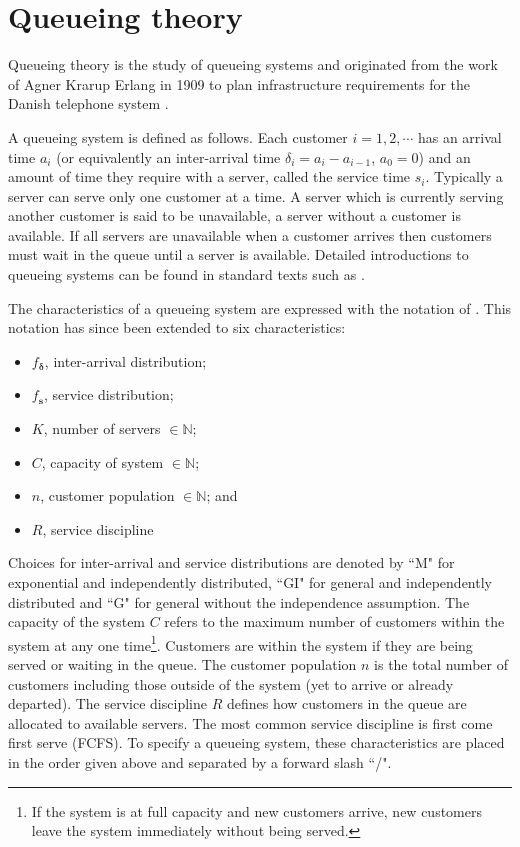 \documentclass[article]{jss}
\begin{document}
\section{Queueing theory} \label{sec:queueing}

Queueing theory is the study of queueing systems and originated from the work of Agner Krarup Erlang in 1909 to plan infrastructure requirements for the Danish telephone system \citep[pg 2]{thomopoulos2012fundamentals}. 

A queueing system is defined as follows. Each customer $i = 1,2,\cdots$ has an arrival time $a_i$ (or equivalently an inter-arrival time $\delta_i = a_i - a_{i-1}$, $a_0 = 0$) and an amount of time they require with a server, called the service time $s_i$. Typically a server can serve only one customer at a time. A server which is currently serving another customer is said to be unavailable, a server without a customer is available. If all servers are unavailable when a customer arrives then customers must wait in the queue until a server is available. Detailed introductions to queueing systems can be found in standard texts such as \citet{bhat2015introduction}. 

The characteristics of a queueing system are expressed with the notation of \citet{kendall1953stochastic}. This notation has since been extended to six characteristics:
\begin{itemize}
\item $f_{\mathbf{\delta}}$, inter-arrival distribution;
\item $f_{\mathbf{s}}$, service distribution; 
\item $K$, number of servers $\in \mathbb{N}$;
\item $C$, capacity of system $\in \mathbb{N}$; 
\item $n$, customer population $\in \mathbb{N}$; and
\item $R$, service discipline
\end{itemize}

Choices for inter-arrival and service distributions are denoted by ``M" for exponential and independently distributed, ``GI" for general and independently distributed and ``G" for general without the independence assumption. The capacity of the system $C$ refers to the maximum number of customers within the system at any one time\footnote{If the system is at full capacity and new customers arrive, new customers leave the system immediately without being served.}. Customers are within the system if they are being served or waiting in the queue. The customer population $n$ is the total number of customers including those outside of the system (yet to arrive or already departed). The service discipline $R$ defines how customers in the queue are allocated to available servers. The most common service discipline is first come first serve (FCFS). To specify a queueing system, these characteristics are placed in the order given above and separated by a forward slash ``/". 
\end{document}

